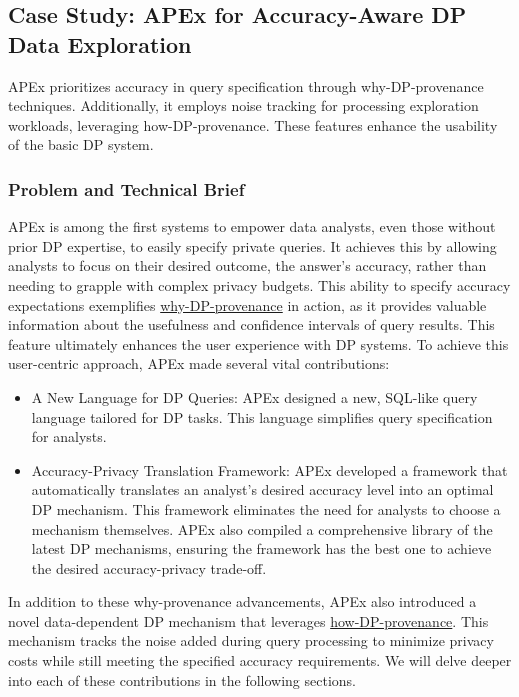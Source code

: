 \subsection{Case Study: APEx for Accuracy-Aware DP Data Exploration}

APEx prioritizes accuracy in query specification through why-DP-provenance techniques. Additionally, it employs noise tracking for processing exploration workloads, leveraging how-DP-provenance. These features enhance the usability of the basic DP system.

\subsubsection{Problem and Technical Brief}
APEx is among the first systems to empower data analysts, even those without prior DP expertise, to easily specify private queries. It achieves this by allowing analysts to focus on their desired outcome, the answer's accuracy, rather than needing to grapple with complex privacy budgets. This ability to specify accuracy expectations exemplifies \underline{why-DP-provenance} in action, as it provides valuable information about the usefulness and confidence intervals of query results. This feature ultimately enhances the user experience with DP systems. To achieve this user-centric approach, APEx made several vital contributions: 
\begin{itemize}
    \item A New Language for DP Queries: APEx designed a new, SQL-like query language tailored for DP tasks. This language simplifies query specification for analysts.
    \item Accuracy-Privacy Translation Framework: APEx developed a framework that automatically translates an analyst's desired accuracy level into an optimal DP mechanism. This framework eliminates the need for analysts to choose a mechanism themselves. APEx also compiled a comprehensive library of the latest DP mechanisms, ensuring the framework has the best one to achieve the desired accuracy-privacy trade-off. 
\end{itemize}
In addition to these why-provenance advancements, APEx also introduced a novel data-dependent DP mechanism that leverages \underline{how-DP-provenance}. This mechanism tracks the noise added during query processing to minimize privacy costs while still meeting the specified accuracy requirements. We will delve deeper into each of these contributions in the following sections.


